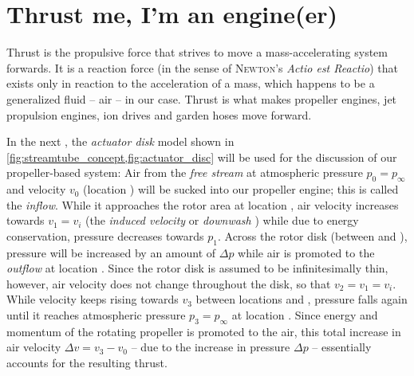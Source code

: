 
\section{Thrust me, I'm an engine(er)}

Thrust %
is the propulsive force that strives to move a mass-accelerating system forwards. 
It is a reaction force (in the sense of \textsc{Newton}'s \textit{Actio est Reactio})
that exists only in reaction to the acceleration of a mass, which happens to be a generalized fluid -- air -- in our case.
Thrust is what makes propeller engines, jet propulsion engines, ion drives and garden 
hoses
move forward.

In the next , 
the \textit{actuator disk} model shown in 
\cref{fig:streamtube_concept,fig:actuator_disc}  
will be used for the discussion of our propeller-based system:
%
Air from the \textit{free stream} at atmospheric pressure $p_0 = p_\infty$ and velocity $v_0$ (location ) will be sucked into our propeller engine; 
this is called the \textit{inflow}. 
While it approaches the rotor area at location , air velocity increases towards $v_1 = v_i$ (the \textit{induced velocity} or \textit{downwash} \cite{seddon2002}) while due to energy conservation, pressure decreases towards $p_1$.
Across the rotor disk (between  and ), pressure will be increased by an amount of $\Delta p$ while air is promoted
to the \textit{outflow} at location . 
Since the rotor disk is assumed to be infinitesimally thin, however, air velocity does not change throughout the disk, so that $v_2 = v_1 = v_i$.
While velocity keeps rising towards $v_3$ between locations  and ,
pressure falls again until it reaches atmospheric pressure $p_3 = p_\infty$ at location .
Since energy and momentum of the rotating propeller is promoted to the air, this total increase in air velocity
$\Delta v = v_3 - v_0$ -- due to the increase in pressure $\Delta p$ -- essentially accounts for the resulting thrust.



